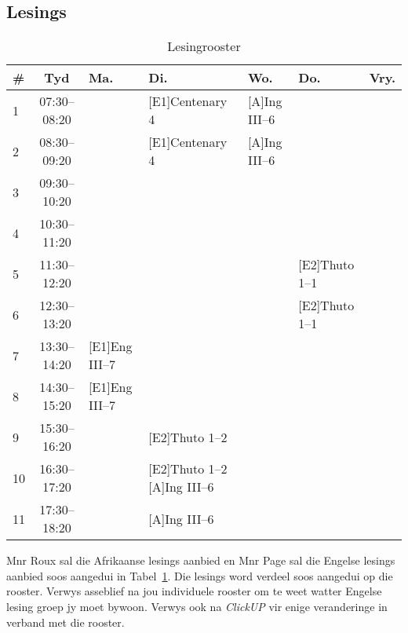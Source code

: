     \subsection{Lesings}
        \begin{table}[!h]
            \begin{center}
             \begin{tabular}{|l|c|p{2.5cm}|p{2.9cm}|p{2.1cm}|p{2.6cm}|p{0.8cm}|}
                 \hline
                 {\bf \#} & {\bf Tyd} & {\bf Ma.} & {\bf Di.} & {\bf Wo.} &
                 {\bf Do.} & {\bf Vry.} \\
                 \hline
                 1  & 07:30--08:20 &  & [E1]Centenary 4 & [A]Ing III--6 &  & \\ \hline
                 2  & 08:30--09:20 &  & [E1]Centenary 4 & [A]Ing III--6 &  & \\ \hline
                 3  & 09:30--10:20 &  &  &  &  & \\ \hline
                 4  & 10:30--11:20 &  &  &  &  & \\ \hline
                 5  & 11:30--12:20 &  &  &  & [E2]Thuto 1--1 & \\ \hline
                 6  & 12:30--13:20 &  &  &  & [E2]Thuto 1--1 & \\ \hline
                 7  & 13:30--14:20 & [E1]Eng III--7 &  &  &  & \\ \hline
                 8  & 14:30--15:20 & [E1]Eng III--7 &  &  &  & \\ \hline
                 9  & 15:30--16:20 &  & [E2]Thuto 1--2 &  &  & \\ \hline
                 10 & 16:30--17:20 &  & [E2]Thuto 1--2 [A]Ing III--6 &  &  & \\ \hline
                 11 & 17:30--18:20 &  & [A]Ing III--6 &  &  & \\
                 \hline
             \end{tabular}
             \caption{Lesingrooster}
            \label{tab:lectures}
            \end{center}
        \end{table}

        Mnr Roux sal die Afrikaanse lesings aanbied en Mnr Page sal die Engelse
        lesings aanbied soos aangedui in Tabel~\ref{tab:lectures}. Die lesings
        word verdeel soos aangedui op die rooster. Verwys asseblief na jou
        individuele rooster om te weet watter Engelse lesing groep jy moet
        bywoon. Verwys ook na \textit{ClickUP} vir enige veranderinge in
        verband met die rooster.

